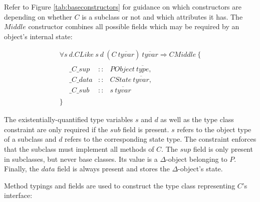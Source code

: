 \documentclass[runningheads,a4paper]{llncs}
\begin{document}
Refer to Figure \ref{tab:baseconstructors} for guidance on which constructors are depending on whether $C$ is a subclass or not and which attributes it has. The $\mathit{Middle}$ constructor combines all possible fields which may be required by an object's internal state:

\begin{displaymath}
\begin{array}{l}
\forall s~d.\mathit{CLike}~s~d~(\mathit{C}~\overline{\mathit{tyvar}})~\overline{\mathit{tyvar}} \Rightarrow \mathit{CMiddle}~\{\\
   \quad \begin{array}{lcl}
   \_\mathit{C}\_\mathit{sup}  & :: & \mathit{PObject}~\overline{\mathit{type}}, \\
   \_\mathit{C}\_\mathit{data} & :: & \mathit{CState}~\overline{\mathit{tyvar}}, \\
   \_\mathit{C}\_\mathit{sub}  & :: & s~\overline{\mathit{tyvar}}
   \end{array}\\
\}
\end{array}
\end{displaymath}

The existentially-quantified type variables $s$ and $d$ as well as the type class constraint are only required if the $\mathit{sub}$ field is present. $s$ refers to the object type of a subclass and $d$ refers to the corresponding state type. The constraint enforces that the subclass must implement all methods of $C$. The $\mathit{sup}$ field is only present in subclasses, but never base classes. Its value is a $\Delta$-object belonging to $P$. Finally, the $\mathit{data}$ field is always present and stores the $\Delta$-object's state.

Method typings and fields are used to construct the type class representing $C$'s interface: 
\end{document}
